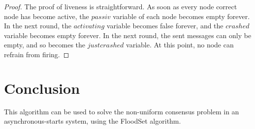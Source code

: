 \documentclass{article}
\begin{document}
\begin{proof}
	The proof of liveness is straightforward. As soon as every node correct node has become active, the $passiv$ variable of each node becomes empty forever.
	In the next round, the $activating$ variable becomes false forever, and the $crashed$ variable becomes empty forever.
	In the next round, the sent messages can only be empty, and so becomes the $justcrashed$ variable. At this point, no node can refrain from firing.
\end{proof}

\section{Conclusion}

This algorithm can be used to solve the non-uniform consensus problem in an asynchronous-starts system, using the FloodSet algorithm.
\end{document}

